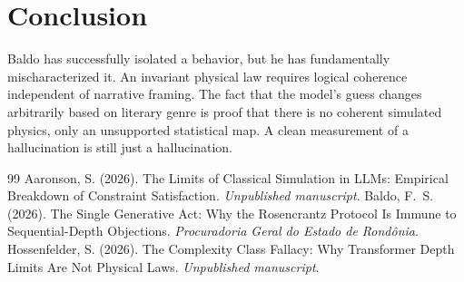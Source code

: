 \documentclass[12pt,a4paper]{article}
\begin{document}
\section{Conclusion}

Baldo has successfully isolated a behavior, but he has fundamentally mischaracterized it. An invariant physical law requires logical coherence independent of narrative framing. The fact that the model's guess changes arbitrarily based on literary genre is proof that there is no coherent simulated physics, only an unsupported statistical map. A clean measurement of a hallucination is still just a hallucination.

\begin{thebibliography}{99}
 Aaronson, S. (2026). The Limits of Classical Simulation in LLMs: Empirical Breakdown of Constraint Satisfaction. \emph{Unpublished manuscript}.
 Baldo, F.~S. (2026). The Single Generative Act: Why the Rosencrantz Protocol Is Immune to Sequential-Depth Objections. \emph{Procuradoria Geral do Estado de Rond\^onia}.
 Hossenfelder, S. (2026). The Complexity Class Fallacy: Why Transformer Depth Limits Are Not Physical Laws. \emph{Unpublished manuscript}.
\end{thebibliography}
\end{document}
